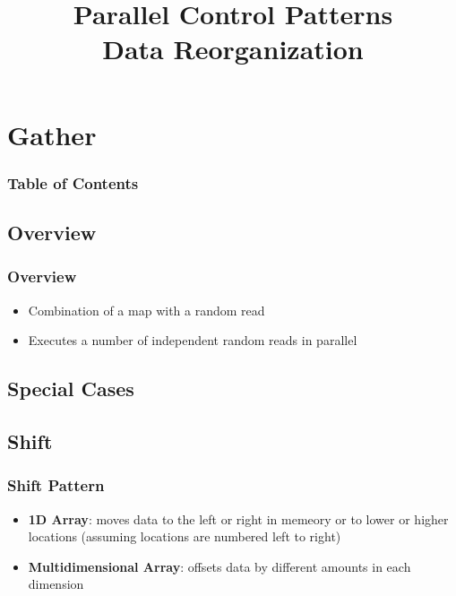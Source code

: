 \documentclass[xcolor=dvipsnames]{beamer}
\begin{document}
	\title[Gather, Scatter and Pack Patterns]{Parallel Control Patterns\\Data Reorganization}
	\author[]{\className}
	\institute[\className]{\departmentName}
	\date{} 


	\begin{frame}
		\maketitle
	\end{frame}


\section{Gather} 

	\begin{frame} \frametitle{Table of Contents}
		\tableofcontents[currentsection]
	\end{frame} 
	
	\subsection{Overview}
	
		\begin{frame} \frametitle{Overview}
			\begin{itemize}
				\item Combination of a map with a random read
				\item Executes a number of independent random reads in parallel
			\end{itemize}
		\end{frame}
		
	\subsection{Special Cases}
	
		\subsection*{Shift}
		\begin{frame} \frametitle{Shift Pattern}
			\begin{itemize}
				\item \textbf{1D Array}: moves data to the left or right in memeory or to lower or higher locations (assuming locations are numbered left to right)
				\item \textbf{Multidimensional Array}: offsets data by different amounts in each dimension
			\end{itemize}
		\end{frame}
		
\end{document}
